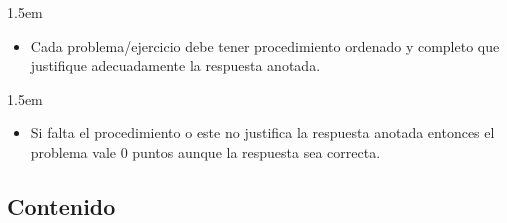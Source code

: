\documentclass[10pt]{article}
\begin{document}
\begin{mddefinitions}%


\begin{mdbmarginx}{}{}{}{1.5em}%
\begin{mddefdata}%

\begin{itemize}[noitemsep,topsep=\mdcompacttopsep]%

\item{}Cada problema/ejercicio debe tener procedimiento ordenado y completo que justifique adecuadamente la respuesta anotada. %
\end{itemize}%
\end{mddefdata}%
\end{mdbmarginx}%

\begin{mdbmarginx}{}{}{}{1.5em}%
\begin{mddefdata}%

\begin{itemize}[noitemsep,topsep=\mdcompacttopsep]%

\item{}Si falta el procedimiento o este no justifica la respuesta anotada entonces el problema vale 0 puntos aunque la respuesta sea correcta.%
\end{itemize}%
\end{mddefdata}%
\end{mdbmarginx}%
\end{mddefinitions}%

\mdhr{}%
\begin{mdtoc}%

\section*{Contenido}\label{sec-contenido}%

\begin{mdtocblock}%


\end{mdtocblock}%
\end{mdtoc}%
\end{document}
